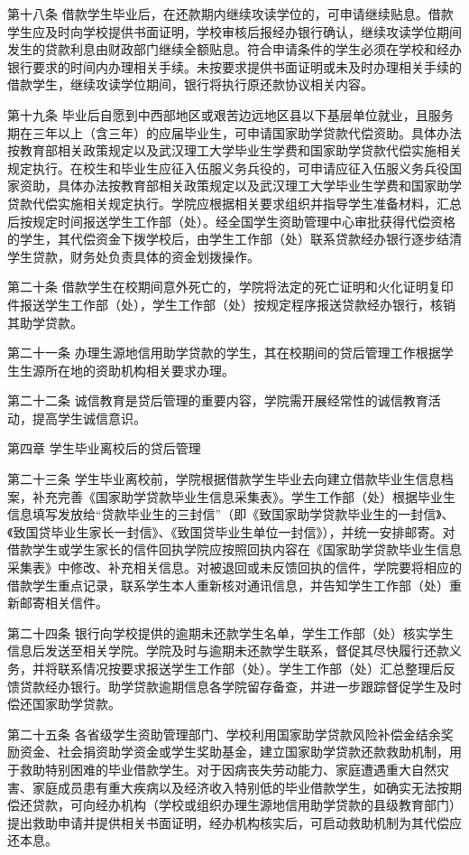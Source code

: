 \documentclass[UTF8,12pt,a4paper]{report}
\begin{document}
第十八条 借款学生毕业后，在还款期内继续攻读学位的，可申请继续贴息。借款学生应及时向学校提供书面证明，学校审核后报经办银行确认，继续攻读学位期间发生的贷款利息由财政部门继续全额贴息。符合申请条件的学生必须在学校和经办银行要求的时间内办理相关手续。未按要求提供书面证明或未及时办理相关手续的借款学生，继续攻读学位期间，银行将执行原还款协议相关内容。

第十九条 毕业后自愿到中西部地区或艰苦边远地区县以下基层单位就业，且服务期在三年以上（含三年）的应届毕业生，可申请国家助学贷款代偿资助。具体办法按教育部相关政策规定以及武汉理工大学毕业生学费和国家助学贷款代偿实施相关规定执行。在校生和毕业生应征入伍服义务兵役的，可申请应征入伍服义务兵役国家资助，具体办法按教育部相关政策规定以及武汉理工大学毕业生学费和国家助学贷款代偿实施相关规定执行。学院应根据相关要求组织并指导学生准备材料，汇总后按规定时间报送学生工作部（处）。经全国学生资助管理中心审批获得代偿资格的学生，其代偿资金下拨学校后，由学生工作部（处）联系贷款经办银行逐步结清学生贷款，财务处负责具体的资金划拨操作。

第二十条 借款学生在校期间意外死亡的，学院将法定的死亡证明和火化证明复印件报送学生工作部（处），学生工作部（处）按规定程序报送贷款经办银行，核销其助学贷款。

第二十一条 办理生源地信用助学贷款的学生，其在校期间的贷后管理工作根据学生生源所在地的资助机构相关要求办理。

第二十二条 诚信教育是贷后管理的重要内容，学院需开展经常性的诚信教育活动，提高学生诚信意识。

第四章 学生毕业离校后的贷后管理

第二十三条 学生毕业离校前，学院根据借款学生毕业去向建立借款毕业生信息档案，补充完善《国家助学贷款毕业生信息采集表》。学生工作部（处）根据毕业生信息填写发放给“贷款毕业生的三封信”（即《致国家助学贷款毕业生的一封信》、《致国贷毕业生家长一封信》、《致国贷毕业生单位一封信》），并统一安排邮寄。对借款学生或学生家长的信件回执学院应按照回执内容在《国家助学贷款毕业生信息采集表》中修改、补充相关信息。对被退回或未反馈回执的信件，学院要将相应的借款学生重点记录，联系学生本人重新核对通讯信息，并告知学生工作部（处）重新邮寄相关信件。

第二十四条 银行向学校提供的逾期未还款学生名单，学生工作部（处）核实学生信息后发送至相关学院。学院及时与逾期未还款学生联系，督促其尽快履行还款义务，并将联系情况按要求报送学生工作部（处）。学生工作部（处）汇总整理后反馈贷款经办银行。助学贷款逾期信息各学院留存备查，并进一步跟踪督促学生及时偿还国家助学贷款。

第二十五条 各省级学生资助管理部门、学校利用国家助学贷款风险补偿金结余奖励资金、社会捐资助学资金或学生奖助基金，建立国家助学贷款还款救助机制，用于救助特别困难的毕业借款学生。对于因病丧失劳动能力、家庭遭遇重大自然灾害、家庭成员患有重大疾病以及经济收入特别低的毕业借款学生，如确实无法按期偿还贷款，可向经办机构（学校或组织办理生源地信用助学贷款的县级教育部门）提出救助申请并提供相关书面证明，经办机构核实后，可启动救助机制为其代偿应还本息。
\end{document}
